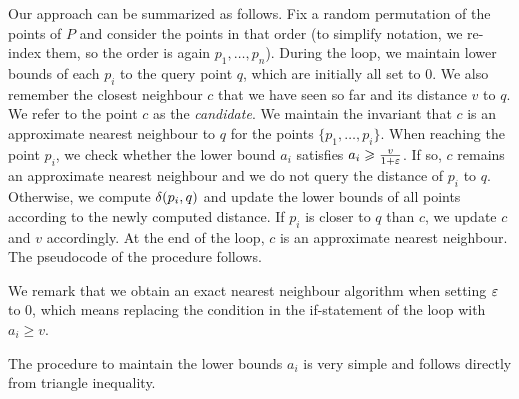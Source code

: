 Our approach can be summarized as follows. 
Fix a random permutation of the points of $P$ 
and consider the points in that order 
(to simplify notation,
we re-index them, so the order is again $p_1, \dots, p_n$).
During the loop, we maintain lower bounds of each $p_i$
to the query point $q$, which are initially all set to $0$.
We also remember the closest neighbour $c$ that we have seen so
far and its distance $v$ to $q$.
We refer to the point $c$ as the \emph{candidate}.
We maintain the invariant that $c$ is an approximate nearest neighbour
to $q$ for the points $\{p_1,\ldots,p_i\}$.
When reaching the point $p_i$, we check whether the lower
bound $a_i$ satisfies $a_i\geqslant \frac{v}{1+\varepsilon}$.
If so, $c$ remains an approximate nearest neighbour and
we do not query the distance of $p_i$ to $q$.
Otherwise, we compute $\delta(p_i,q)$ and update the lower bounds
of all points according to the newly computed distance.
If $p_i$ is closer to $q$ than $c$, we update $c$ and $v$
accordingly. At the end of the loop, $c$ is an approximate nearest
neighbour. The pseudocode of the procedure follows.


\begin{algorithmic}
\label{alg:ann_blind}

    \State {}
        \Else
            \State {}
            \EndIf
        \EndIf
    \EndFor
    \State {}
\EndFunction
\end{algorithmic}

We remark that we obtain an exact nearest neighbour algorithm
when setting $\varepsilon$ to $0$, which means 
replacing the condition in the if-statement of the loop
with $a_i\geq v$.

The procedure to maintain the lower bounds $a_i$
is very simple and follows directly
from triangle inequality.

\begin{algorithmic}
    \EndFor
\EndProcedure
\end{algorithmic}

